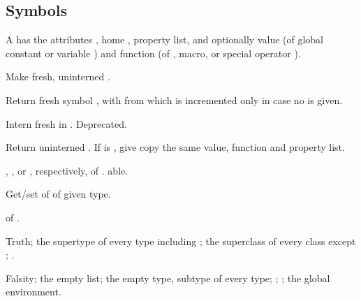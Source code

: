 \subsection{Symbols}
A  has the attributes , home , property
list, and optionally value (of global constant or variable ) and
function (of , macro, or special operator ).

\begin{LIST}{1cm}

  {
  Make fresh, uninterned .
  }

  {
  Return fresh symbol , with  from
   which is incremented only in case no 
  is given. 
  }

  {
  Intern fresh  in . Deprecated.
  }

  {
  Return uninterned . If  is
  \T, give copy the same value, function and property list.
  }

  {
  , , or , respectively,
  of . able. 
  }

  {
  Get/set  of  of given
  type.
  }

  {
   of .
  }

  {
  Truth; the supertype of every type including ; the superclass of every
  class except ; .
  }

  {
  Falsity; the empty list; the empty type, subtype of every type; ;
  ; the global environment.
  }

\end{LIST}


